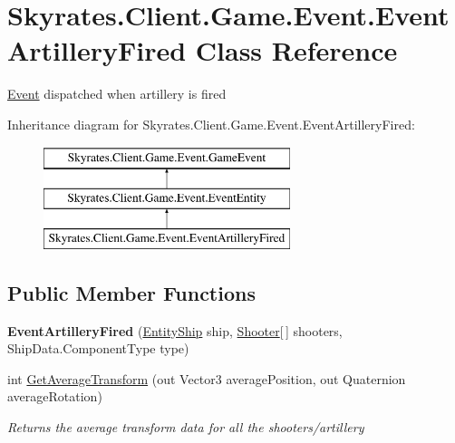 \hypertarget{class_skyrates_1_1_client_1_1_game_1_1_event_1_1_event_artillery_fired}{\section{Skyrates.\-Client.\-Game.\-Event.\-Event\-Artillery\-Fired Class Reference}
\label{class_skyrates_1_1_client_1_1_game_1_1_event_1_1_event_artillery_fired}
}


\hyperlink{namespace_skyrates_1_1_client_1_1_game_1_1_event}{Event} dispatched when artillery is fired  


Inheritance diagram for Skyrates.\-Client.\-Game.\-Event.\-Event\-Artillery\-Fired\-:\begin{figure}[H]
\begin{center}
\leavevmode
\includegraphics[height=3.000000cm]{class_skyrates_1_1_client_1_1_game_1_1_event_1_1_event_artillery_fired}
\end{center}
\end{figure}
\subsection*{Public Member Functions}
\begin{DoxyCompactItemize}
\item 
\hypertarget{class_skyrates_1_1_client_1_1_game_1_1_event_1_1_event_artillery_fired_ad96387f1828321d246f059b5ecb0018d}{{\bfseries Event\-Artillery\-Fired} (\hyperlink{class_skyrates_1_1_client_1_1_entity_1_1_entity_ship}{Entity\-Ship} ship, \hyperlink{class_skyrates_1_1_client_1_1_mono_1_1_shooter}{Shooter}\mbox{[}$\,$\mbox{]} shooters, Ship\-Data.\-Component\-Type type)}\label{class_skyrates_1_1_client_1_1_game_1_1_event_1_1_event_artillery_fired_ad96387f1828321d246f059b5ecb0018d}

\item 
int \hyperlink{class_skyrates_1_1_client_1_1_game_1_1_event_1_1_event_artillery_fired_a58bb7b842dad16ff93c6702295648238}{Get\-Average\-Transform} (out Vector3 average\-Position, out Quaternion average\-Rotation)
\begin{DoxyCompactList}\small\item\em Returns the average transform data for all the shooters/artillery \end{DoxyCompactList}\end{DoxyCompactItemize}
